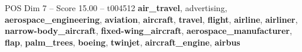\begin{textsample}{POS Dim 7 – Score 15.00 – t004512}  \label{ex:f7_pos_036}
\textbf{air\_travel}, advertising, \textbf{aerospace\_engineering}, \textbf{aviation}, \textbf{aircraft}, \textbf{travel}, \textbf{flight}, \textbf{airline}, \textbf{airliner}, \textbf{narrow-body\_aircraft}, \textbf{fixed-wing\_aircraft}, \textbf{aerospace\_manufacturer}, \textbf{flap}, \textbf{palm\_trees}, \textbf{boeing}, \textbf{twinjet}, \textbf{aircraft\_engine}, \textbf{airbus}

\end{textsample}
